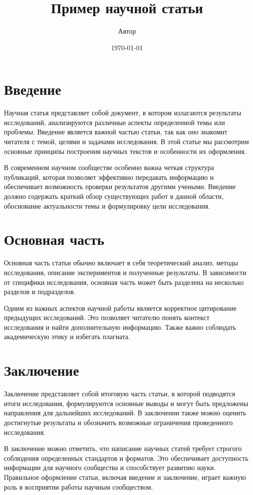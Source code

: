 \documentclass{article}
\title{Пример научной статьи}
\author{Автор}
\date{\today}
\begin{document}
\maketitle

\section{Введение}
Научная статья представляет собой документ, в котором излагаются результаты исследований, анализируются различные аспекты определенной темы или проблемы. Введение является важной частью статьи, так как оно знакомит читателя с темой, целями и задачами исследования. В этой статье мы рассмотрим основные принципы построения научных текстов и особенности их оформления.

В современном научном сообществе особенно важна четкая структура публикаций, которая позволяет эффективно передавать информацию и обеспечивает возможность проверки результатов другими учеными. Введение должно содержать краткий обзор существующих работ в данной области, обоснование актуальности темы и формулировку цели исследования.

\section{Основная часть}
Основная часть статьи обычно включает в себя теоретический анализ, методы исследования, описание экспериментов и полученные результаты. В зависимости от специфики исследования, основная часть может быть разделена на несколько разделов и подразделов.

Одним из важных аспектов научной работы является корректное цитирование предыдущих исследований. Это позволяет читателю понять контекст исследования и найти дополнительную информацию. Также важно соблюдать академическую этику и избегать плагиата.

\section{Заключение}
Заключение представляет собой итоговую часть статьи, в которой подводятся итоги исследования, формулируются основные выводы и могут быть предложены направления для дальнейших исследований. В заключении также можно оценить достигнутые результаты и обозначить возможные ограничения проведенного исследования.

В заключение можно отметить, что написание научных статей требует строгого соблюдения определенных стандартов и форматов. Это обеспечивает доступность информации для научного сообщества и способствует развитию науки. Правильное оформление статьи, включая введение и заключение, играет важную роль в восприятии работы научным сообществом.
\end{document}
